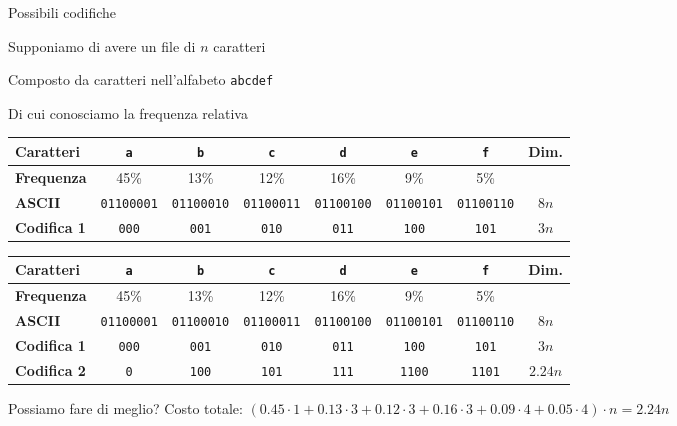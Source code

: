 \begin{frame}{Possibili codifiche}

\BI
\item Supponiamo di avere un file di $n$ caratteri
\item Composto da caratteri nell'alfabeto \texttt{abcdef}
\item Di cui conosciamo la frequenza relativa
\EI

\bigskip
\begin{overprint}
\begin{tabular}{|l|c|c|c|c|c|c|c|}
\hline
\textbf{Caratteri} & \texttt{a} & \texttt{b} & \texttt{c} & \texttt{d} & \texttt{e} & \texttt{f} & \textbf{Dim.} \\\hline
\textbf{Frequenza} & 45\% & 13\% & 12\% & 16\% & 9\% & 5\% & \\ \hline
\textbf{ASCII} & \texttt{\tiny 01100001} & \texttt{\tiny 01100010} & \texttt{\tiny 01100011} & \texttt{\tiny 01100100} & \texttt{\tiny 01100101} & \texttt{\tiny 01100110} & $8n$ \\\hline
\textbf{Codifica 1} & \texttt{\small 000} & \texttt{\small 001} & \texttt{\small 010} & \texttt{\small 011} & \texttt{\small 100} & \texttt{\small 101} & $3n$ \\\hline
\end{tabular}
\begin{tabular}{|l|c|c|c|c|c|c|c|}
\hline
\textbf{Caratteri} & \texttt{a} & \texttt{b} & \texttt{c} & \texttt{d} & \texttt{e} & \texttt{f} & \textbf{Dim.} \\\hline
\textbf{Frequenza} & 45\% & 13\% & 12\% & 16\% & 9\% & 5\% & \\ \hline
\textbf{ASCII} & \texttt{\tiny 01100001} & \texttt{\tiny 01100010} & \texttt{\tiny 01100011} & \texttt{\tiny 01100100} & \texttt{\tiny 01100101} & \texttt{\tiny 01100110} & $8n$ \\\hline
\textbf{Codifica 1} & \texttt{\small 000} & \texttt{\small 001} & \texttt{\small 010} & \texttt{\small 011} & \texttt{\small 100} & \texttt{\small 101} & $3n$ \\\hline
\textbf{Codifica 2} & \texttt{\small 0} & \texttt{\small 100} & \texttt{\small 101} & \texttt{\small 111} & \texttt{\small 1100} & \texttt{\small 1101} & $2.24n$ \\\hline
\end{tabular}
\end{overprint}
\bigskip
\begin{overprint}
\alert{Possiamo fare di meglio?}
\alert{Costo totale}: $(0.45 \cdot 1+0.13 \cdot 3+0.12 \cdot 3+0.16 \cdot 3+0.09 \cdot 4+0.05 \cdot 4) \cdot n=2.24n$
\end{overprint}
\end{frame}

